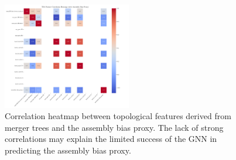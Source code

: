 \documentclass[twocolumn]{aastex631}
\begin{document}
\begin{figure}[htbp]
    \centering
    \includegraphics[width=0.5\textwidth]{../input_files/plots/tda_feature_correlation_heatmap_3_1748137556.png}
    \caption{\label{fig:tda_correlation}Correlation heatmap between topological features derived from merger trees and the assembly bias proxy. The lack of strong correlations may explain the limited success of the GNN in predicting the assembly bias proxy.}
\end{figure}
\end{document}
